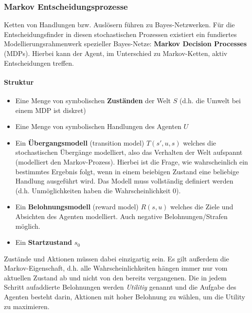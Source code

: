 \subsubsection{Markov Entscheidungsprozesse}
Ketten von Handlungen bzw. Ausl\"osern f\"uhren zu Bayes-Netzwerken. F\"ur die Entscheidungsfinder in diesen stochastischen Prozessen existiert ein fundiertes Modellierungsrahmenwerk spezieller Bayes-Netze: \textbf{Markov Decision Processes} (MDPs). Hierbei kann der Agent, im Unterschied zu Markov-Ketten, aktiv Entscheidungen treffen.

\paragraph{Struktur}
\begin{itemize}
\item Eine Menge von symbolischen \textbf{Zust\"anden} der Welt $S$ (d.h. die Umwelt bei einem MDP ist diskret)
\item Eine Menge von symbolischen Handlungen des Agenten $U$
\item Ein \textbf{\"Ubergangsmodell} (transition model) $T(s', u, s)$ welches die stochastischen \"Uberg\"ange modelliert, also das Verhalten der Welt aufspannt (modelliert den Markov-Prozess). Hierbei ist die Frage, wie wahrscheinlich ein bestimmtes Ergebnis folgt, wenn in einem beiebigen Zustand eine beliebige Handlung ausgeführt wird. Das Modell muss vollständig definiert werden (d.h.     Unmöglichkeiten haben die Wahrscheinlichkeit 0).
\item Ein \textbf{Belohnungsmodell} (reward model) $R(s,u)$ welches die Ziele und Absichten des Agenten modelliert. Auch negative Belohnungen/Strafen möglich. 
\item Ein \textbf{Startzustand} $s_0$
\end{itemize}
Zust\"ande und Aktionen m\"ussen dabei einzigartig sein.
Es gilt au{\ss}erdem die Markov-Eigenschaft, d.h. alle Wahrscheinlichkeiten h\"angen immer nur vom aktuellen Zustand ab und nicht von den bereits vergangenen.
Die in jedem Schritt aufaddierte Belohnungen werden \emph{Utilitiy} genannt und die Aufgabe des Agenten besteht darin, Aktionen mit hoher Belohnung zu w\"ahlen, um die Utility zu maximieren.

